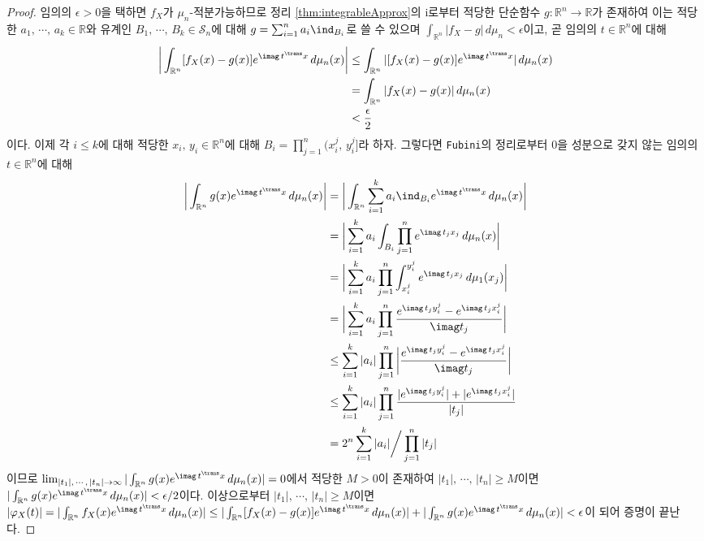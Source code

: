 \begin{proof}
    임의의 $\epsilon>0$을 택하면 $f_X$가 $\mu_n$-적분가능하므로 정리 \ref{thm:integrableApprox}의 i로부터 적당한 단순함수 $g:\mathbb{R}^n\to\mathbb{R}$가 존재하여 이는 적당한 $a_1,\,\cdots,\,a_k\in\mathbb{R}$와 유계인 $B_1,\,\cdots,\,B_k\in\mathcal{S}_n$에 대해 $g=\sum_{i=1}^na_i\ind_{B_i}$로 쓸 수 있으며 $\int_{\mathbb{R}^n}|f_X-g|\,d\mu_n<\epsilon$이고, 곧 임의의 $t\in\mathbb{R}^n$에 대해
    \begin{align*}
        \bigg|\int_{\mathbb{R}^n}[f_X(x)-g(x)]e^{\imag\,t^\trans x}\,d\mu_n(x)\bigg|&\leq\int_{\mathbb{R}^n}|[f_X(x)-g(x)]e^{\imag\,t^\trans x}|\,d\mu_n(x)\\
        &=\int_{\mathbb{R}^n}|f_X(x)-g(x)|\,d\mu_n(x)\\
        &<\frac{\epsilon}{2}
    \end{align*}
    이다. 이제 각 $i\leq k$에 대해 적당한 $x_i,\,y_i\in\mathbb{R}^n$에 대해 $B_i=\prod_{j=1}^n(x_i^j,\,y_i^j]$라 하자. 그렇다면 \texttt{Fubini}의 정리로부터 $0$을 성분으로 갖지 않는 임의의 $t\in\mathbb{R}^n$에 대해
    \begin{align*}
        \bigg|\int_{\mathbb{R}^n}g(x)e^{\imag\,t^\trans x}\,d\mu_n(x)\bigg|&=\bigg|\int_{\mathbb{R}^n}\sum_{i=1}^ka_i\ind_{B_i}e^{\imag\,t^\trans x}\,d\mu_n(x)\bigg|\\
        &=\bigg|\sum_{i=1}^ka_i\int_{B_i}\prod_{j=1}^ne^{\imag\,t_jx_j}\,d\mu_n(x)\bigg|\\
        &=\bigg|\sum_{i=1}^ka_i\prod_{j=1}^n\int_{x_i^j}^{y_i^j}e^{\imag\,t_jx_j}\,d\mu_1(x_j)\bigg|\\
        &=\bigg|\sum_{i=1}^ka_i\prod_{j=1}^n\frac{e^{\imag\,t_jy_i^j}-e^{\imag\,t_jx_i^j}}{\imag t_j}\bigg|\\
        &\leq\sum_{i=1}^k|a_i|\prod_{j=1}^n\bigg|\frac{e^{\imag\,t_jy_i^j}-e^{\imag\,t_jx_i^j}}{\imag t_j}\bigg|\\
        &\leq\sum_{i=1}^k|a_i|\prod_{j=1}^n\frac{|e^{\imag\,t_jy_i^j}|+|e^{\imag\,t_jx_i^j}|}{|t_j|}\\
        &=2^n\sum_{i=1}^k|a_i|\bigg/\prod_{j=1}^n|t_j|
    \end{align*}
    이므로 $\lim_{|t_1|,\,\cdots,\,|t_n|\to\infty}|\int_{\mathbb{R}^n}g(x)e^{\imag\,t^\trans x}\,d\mu_n(x)|=0$에서 적당한 $M>0$이 존재하여 $|t_1|,\,\cdots,\,|t_n|\geq M$이면 $|\int_{\mathbb{R}^n}g(x)e^{\imag\,t^\trans x}\,d\mu_n(x)|<\epsilon/2$이다. 이상으로부터 $|t_1|,\,\cdots,\,|t_n|\geq M$이면 $|\varphi_X(t)|=|\int_{\mathbb{R}^n}f_X(x)e^{\imag\,t^\trans x}\,d\mu_n(x)|\leq|\int_{\mathbb{R}^n}[f_X(x)-g(x)]e^{\imag\,t^\trans x}\,d\mu_n(x)|+|\int_{\mathbb{R}^n}g(x)e^{\imag\,t^\trans x}\,d\mu_n(x)|<\epsilon$이 되어 증명이 끝난다.
\end{proof}

